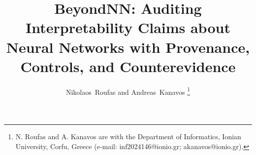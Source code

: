 \documentclass[journal]{IEEEtran}
\begin{document}
\title{BeyondNN: Auditing Interpretability Claims about Neural Networks with Provenance, Controls, and Counterevidence}

\author{Nikolaos~Roufas and Andreas~Kanavos
\thanks{N. Roufas and A. Kanavos are with the Department of Informatics, Ionian University, Corfu, Greece (e-mail: inf2024146@ionio.gr; akanavos@ionio.gr).}}


\maketitle













\end{document}
